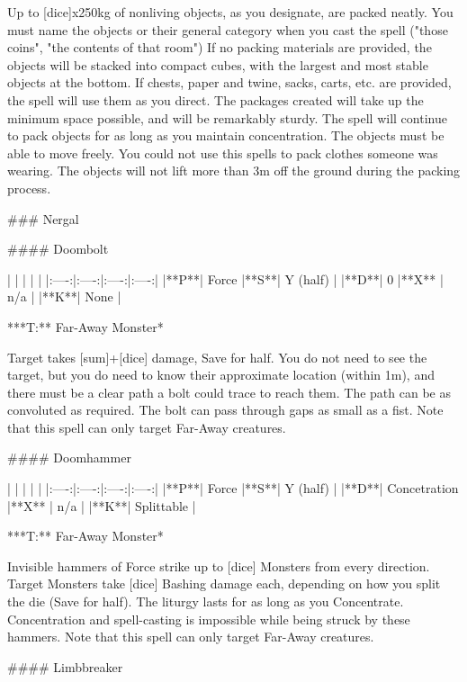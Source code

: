  Up to [dice]x250kg of nonliving objects, as you designate, are packed neatly. You must name the objects or their general category when you cast the spell ("those coins", "the contents of that room") If no packing materials are provided, the objects will be stacked into compact cubes, with the largest and most stable objects at the bottom. If chests, paper and twine, sacks, carts, etc. are provided, the spell will use them as you direct. The packages created will take up the minimum space possible, and will be remarkably sturdy. The spell will continue to pack objects for as long as you maintain concentration. The objects must be able to move freely. You could not use this spells to pack clothes someone was wearing. The objects will not lift more than 3m off the ground during the packing process.



### Nergal





#### Doombolt

| | | | |
|:----:|:----:|:----:|:----:|
|**P**| Force |**S**|  Y (half) |
|**D**| 0 |**X** |  n/a  |
|**K**| None |


***T:**   Far-Away Monster*



Target takes [sum]+[dice] damage, Save for half. You do not need to see the target, but you do need to know their approximate location (within 1m), and there must be a clear path a bolt could trace to reach them. The path can be as convoluted as required. The bolt can pass through gaps as small as a fist.  Note that this spell can only target Far-Away creatures.




#### Doomhammer

| | | | |
|:----:|:----:|:----:|:----:|
|**P**| Force |**S**|  Y (half) |
|**D**| Concetration |**X** |  n/a  |
|**K**| Splittable |

***T:**   Far-Away Monster*



Invisible hammers of Force strike up to [dice] Monsters from every direction.  Target Monsters take [dice] Bashing damage each, depending on how you split the die (Save for half).  The liturgy lasts for as long as you Concentrate.  Concentration and spell-casting is impossible while being struck by these hammers. Note that this spell can only target Far-Away creatures.




#### Limbbreaker

